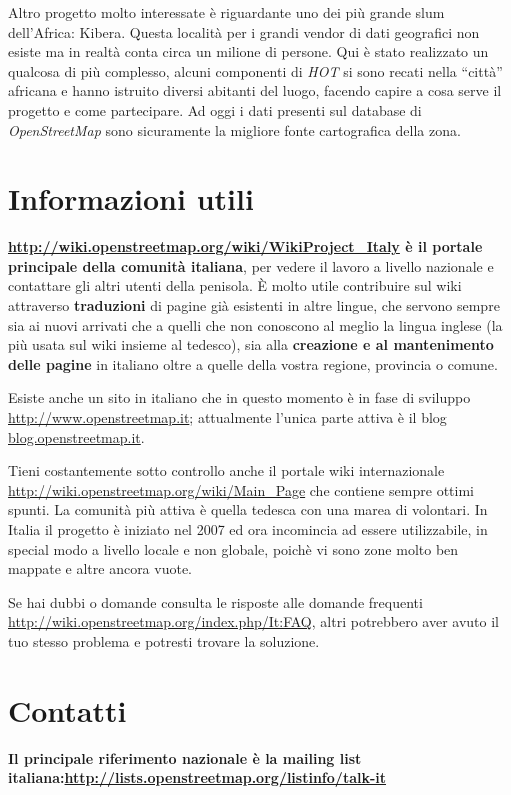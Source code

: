 \documentclass[a4paper,twoside,12pt,]{article}
\newcommand{\osm}{\emph{OpenStreetMap}\xspace}
\newcommand{\pro}[1]{\emph{#1}}
\begin{document}
Altro progetto molto interessate è riguardante uno dei più grande slum dell'Africa: Kibera.
Questa località per i grandi vendor di dati geografici non esiste ma in realtà conta circa un milione di persone. Qui è stato realizzato un qualcosa di più complesso, alcuni componenti di \pro{HOT} si sono recati nella ``città'' africana e hanno istruito diversi abitanti del luogo, facendo capire a cosa serve il progetto e come partecipare. Ad oggi i dati presenti sul database di \osm sono sicuramente la migliore fonte cartografica della zona.
\section{Informazioni utili}
\textbf{\url{http://wiki.openstreetmap.org/wiki/WikiProject_Italy} è il portale principale della comunità italiana}, per vedere il lavoro a livello nazionale e contattare gli altri utenti della penisola. È molto utile contribuire sul wiki attraverso \textbf{traduzioni} di pagine già esistenti in altre lingue, che servono sempre sia ai nuovi arrivati che a quelli che non conoscono al meglio la lingua inglese (la più usata sul wiki insieme al tedesco), sia alla \textbf{creazione e al mantenimento delle pagine} in italiano oltre a quelle della vostra regione, provincia o comune.

Esiste anche un sito in italiano che in questo momento è in fase di sviluppo \url{http://www.openstreetmap.it}; attualmente l'unica parte attiva è il blog \url{blog.openstreetmap.it}.

Tieni costantemente sotto controllo anche il portale wiki internazionale \url{http://wiki.openstreetmap.org/wiki/Main_Page} che contiene sempre ottimi spunti.  La comunità più attiva è quella tedesca con una marea di volontari. In Italia il progetto è iniziato nel 2007 ed ora incomincia ad essere utilizzabile, in special modo a livello locale e non globale, poichè vi sono zone molto ben mappate e altre ancora vuote.

Se hai dubbi o domande consulta le risposte alle domande frequenti \url{http://wiki.openstreetmap.org/index.php/It:FAQ}, altri potrebbero aver avuto il tuo stesso problema e potresti trovare la soluzione.
\section{Contatti}
\textbf{Il principale riferimento nazionale è la mailing list italiana:\newline \url{http://lists.openstreetmap.org/listinfo/talk-it}}
\end{document}
